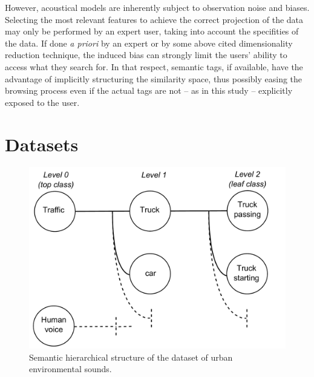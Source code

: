 \documentclass{aes2e}
\begin{document}
However, acoustical models are inherently subject to observation noise and biases. Selecting the most relevant features to achieve the correct projection of the data may only be performed by an expert user, taking into account the specifities of the data. If done \textit{a priori} by an expert or by some above cited dimensionality reduction technique, the induced bias can strongly limit the users' ability to access what they search for. In that respect, semantic tags, if available, have the advantage of implicitly structuring the similarity space, thus possibly easing the browsing process even if the actual tags are not -- as in this study -- explicitly exposed to the user.

\section{Datasets} \label{dataset}


\begin{figure}[t]
\begin{center}
\includegraphics[scale=0.24]{gfx/dataset.pdf} 
\end{center}
\caption{\label{figdataset} Semantic hierarchical structure of the dataset of urban environmental sounds.}
\end{figure}
\end{document}
